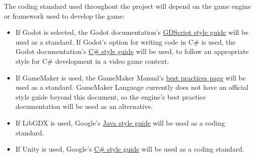The coding standard used throughout the project will depend on the game engine 
or framework used to develop the game:

\begin{itemize}
	\item If Godot is selected, the Godot documentation's 
	\href{https://docs.godotengine.org/en/stable/tutorials/scripting/gdscript/gdscript_styleguide.html}{GDScript
	 style guide} 
	\cite{GodotGDStyleGuide} will be used as a standard. If Godot's option for 
	writing code in C\# is used, the Godot documentation's 
	\href{https://docs.godotengine.org/en/stable/tutorials/scripting/c_sharp/c_sharp_style_guide.html}{C\#
	 style guide} 
	\cite{GodotCSharpStyleGuide} will 
	be used, to follow an appropriate style for C\# development in a video game 
	context.
	\item If GameMaker is used, the GameMaker Manual's 
	\href{https://manual.gamemaker.io/lts/en/index.htm#t=Additional_Information\%2FBest_Practices_When_Programming.htm}{best
	 practices page} \cite{GMLStyleGuide} will be used as a standard. GameMaker 
	Language currently does not have an official style guide beyond this 
	document, so the engine's best practice documentation will be used as an 
	alternative.
	\item If LibGDX is used, Google's 
	\href{https://google.github.io/styleguide/javaguide.html\#s5-naming}{Java 
	style guide} 
	\cite{GoogleJavaStyle} will be used as a coding standard.
	\item If Unity is used, Google's 
	\href{https://google.github.io/styleguide/csharp-style.html}{C\# style 
	guide} 
	\cite{GoogleCSharpStyle} will be used as a coding standard.
\end{itemize} 